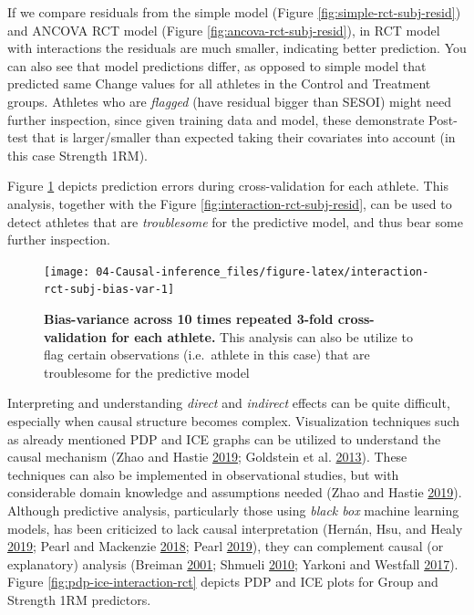 \documentclass[
]{book}
\begin{document}
If we compare residuals from the simple model (Figure \ref{fig:simple-rct-subj-resid}) and ANCOVA RCT model (Figure \ref{fig:ancova-rct-subj-resid}), in RCT model with interactions the residuals are much smaller, indicating better prediction. You can also see that model predictions differ, as opposed to simple model that predicted same Change values for all athletes in the Control and Treatment groups. Athletes who are \emph{flagged} (have residual bigger than SESOI) might need further inspection, since given training data and model, these demonstrate Post-test that is larger/smaller than expected taking their covariates into account (in this case Strength 1RM).

Figure \ref{fig:interaction-rct-subj-bias-var} depicts prediction errors during cross-validation for each athlete. This analysis, together with the Figure \ref{fig:interaction-rct-subj-resid}, can be used to detect athletes that are \emph{troublesome} for the predictive model, and thus bear some further inspection.

\begin{figure}

{\centering \texttt{[image: 04-Causal-inference\_files/figure-latex/interaction-rct-subj-bias-var-1]} 

}

\caption{\textbf{Bias-variance across 10 times repeated 3-fold cross-validation for each athlete. } This analysis can also be utilize to flag certain observations (i.e.~athlete in this case) that are troublesome for the predictive model}\label{fig:interaction-rct-subj-bias-var}
\end{figure}



Interpreting and understanding \emph{direct} and \emph{indirect} effects can be quite difficult, especially when causal structure becomes complex. Visualization techniques such as already mentioned PDP and ICE graphs can be utilized to understand the causal mechanism (Zhao and Hastie \protect\hyperlink{ref-zhaoCausalInterpretationsBlackBox2019}{2019}; Goldstein et al. \protect\hyperlink{ref-goldsteinPeekingBlackBox2013}{2013}). These techniques can also be implemented in observational studies, but with considerable domain knowledge and assumptions needed (Zhao and Hastie \protect\hyperlink{ref-zhaoCausalInterpretationsBlackBox2019}{2019}). Although predictive analysis, particularly those using \emph{black box} machine learning models, has been criticized to lack causal interpretation (Hernán, Hsu, and Healy \protect\hyperlink{ref-hernanSecondChanceGet2019}{2019}; Pearl and Mackenzie \protect\hyperlink{ref-pearlBookWhyNew2018}{2018}; Pearl \protect\hyperlink{ref-pearlSevenToolsCausal2019}{2019}), they can complement causal (or explanatory) analysis (Breiman \protect\hyperlink{ref-breimanStatisticalModelingTwo2001}{2001}; Shmueli \protect\hyperlink{ref-shmueliExplainPredict2010}{2010}; Yarkoni and Westfall \protect\hyperlink{ref-yarkoniChoosingPredictionExplanation2017}{2017}). Figure \ref{fig:pdp-ice-interaction-rct} depicts PDP and ICE plots for Group and Strength 1RM predictors.
\end{document}
